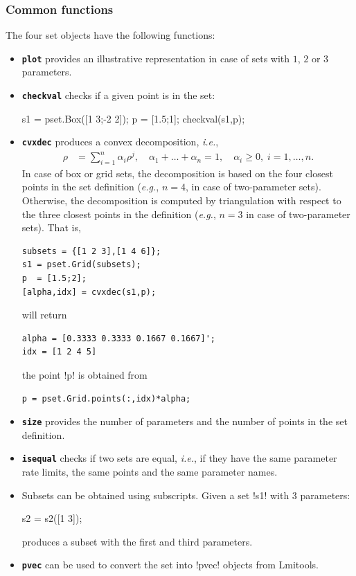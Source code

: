 \documentclass[fleqn,11pt]{article}
\newcommand{\lcode}[1]{\textbf{%
    \lstinline[style=mystyle]{#1}}}
\newcommand{\p}{\rho}
\newcommand{\ie}{{\em i.e.}\xspace}
\newcommand{\eg}{{\em e.g.}\xspace}
\begin{document}
\subsubsection{Common functions}\label{sssec:setCommon}

The four set objects have the following functions:
\begin{itemize}
  \item \lcode{plot} provides an illustrative representation in case of sets with $1$, $2$ or $3$ parameters.

  \item \lcode{checkval} checks if a given point is in the set:
\begin{code}
s1 = pset.Box([1 3;-2 2]);
p  = [1.5;1];
checkval(s1,p);
\end{code}

  \item \lcode{cvxdec} produces a convex decomposition, \ie,
        \begin{align*}
            \p &= \sum_{i=1}^{n}\alpha_i\p^{j},
            \quad\alpha_1+\dots+\alpha_n=1,
            \quad \alpha_i\geq0, \;i=1,\dots,n.
        \end{align*}
        In case of box or grid sets, the decomposition is based on the four closest points in the set definition (\eg, $n=4$, in case of two-parameter sets). Otherwise, the decomposition is computed by triangulation with respect to the three closest points in the definition (\eg, $n=3$ in case of two-parameter sets). That is,
\begin{lstlisting}[style=mystyle]
subsets = {[1 2 3],[1 4 6]};
s1 = pset.Grid(subsets);
p  = [1.5;2];
[alpha,idx] = cvxdec(s1,p);
\end{lstlisting}
will return
\begin{lstlisting}[style=mystyle]
alpha = [0.3333 0.3333 0.1667 0.1667]';
idx = [1 2 4 5]
\end{lstlisting}
the point !p! is obtained from
\begin{lstlisting}[style=mystyle]
p = pset.Grid.points(:,idx)*alpha;
\end{lstlisting}

\item \lcode{size} provides the number of parameters and the number of points in the set definition.

\item \lcode{isequal} checks if two sets are equal, \ie, if they have the same parameter rate limits, the same points and the same parameter names.

\item Subsets can be obtained using subscripts. Given a set !s1! with $3$ parameters:
\begin{code}
s2 = s2([1 3]);
\end{code}
    produces a subset with the first and third parameters.

\item \lcode{pvec} can be used to convert the set into !pvec! objects from Lmitools.
\end{itemize}
\end{document}
